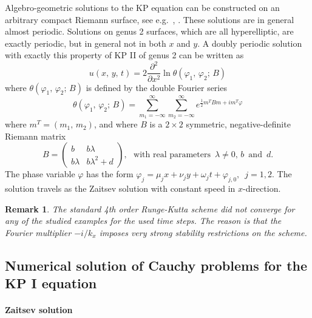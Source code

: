 \documentclass[final]{siamltex}
\newtheorem{remark}[theorem]{Remark}
\begin{document}
Algebro-geometric solutions to the KP equation can be constructed  on an
arbitrary compact Riemann surface, see e.g.~\cite{Dub}, 
\cite{FK}. These solutions are in general almost 
periodic. Solutions on genus 2 surfaces, which are all hyperelliptic, 
are exactly periodic, but in general not in both $x$ and $y$. A 
doubly periodic solution with exactly this property of KP II of genus 2 can be written as
\begin{equation}
u(x,\, y,\, t)=2\frac{\partial^{2}}{\partial x^{2}}\ln\theta\left(\varphi_{1},\,\varphi_{2};\, B\right)
\end{equation}
where $\theta\left(\varphi_{1},\,\varphi_{2};\, B\right)$ is defined by the double Fourier series
\begin{equation}
\theta\left(\varphi_{1},\,\varphi_{2};\, B\right)=\overset{\infty}{\underset{m_{1}=-\infty}
{\sum}}\overset{\infty}{\underset{m_{2}=-\infty}{\sum}}e^{\frac{1}{2}m^{T}Bm+im^{T}\varphi}
\end{equation}
where $m^{T}=\left(m_{1},\, m_{2}\right)$, and where $B$ is a $2\times2$
symmetric, negative-definite Riemann matrix 
\[
B=\left(\begin{array}{cc}
b & b\lambda\\
b\lambda & b\lambda^{2}+d\end{array}\right),\,\,\,\,
\mbox{with real parameters}\,\,\,\lambda\neq0,\, b\,\,\,\mbox{and}\,\,\, d.
\]
 The phase variable $\varphi$ has the form $\varphi_{j}=\mu_{j}x+\nu_{j}y+\omega_{j}t+\varphi_{j,0},\,\,\, j=1,2.$
The solution travels as the 
Zaitsev solution with constant speed in $x$-direction.

\begin{remark}
    The standard 4th order Runge-Kutta scheme did not converge for 
    any of the studied examples for the used time steps. The reason is 
    that the Fourier multiplier $-i/k_{x}$ imposes very strong 
    stability restrictions on the scheme. 
\end{remark}

\subsection{Numerical solution of Cauchy problems for the KP I equation}

\paragraph{Zaitsev solution}
\end{document}
